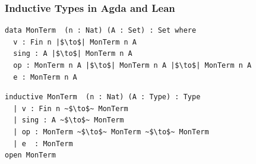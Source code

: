 \documentclass[t,10pt,numbers,fleqn,usenames,xcolor=dvipsnames]{beamer}
\begin{document}
\begin{frame}[fragile] 
\frametitle{Inductive Types in Agda and Lean} 
\begin{verbatim} 
data MonTerm  (n : Nat) (A : Set) : Set where 
  v : Fin n |$\to$| MonTerm n A 
  sing : A |$\to$| MonTerm n A 
  op : MonTerm n A |$\to$| MonTerm n A |$\to$| MonTerm n A 
  e : MonTerm n A 
\end{verbatim}
\begin{verbatim} 
inductive MonTerm  (n : Nat) (A : Type) : Type 
  | v : Fin n ~$\to$~ MonTerm
  | sing : A ~$\to$~ MonTerm
  | op : MonTerm ~$\to$~ MonTerm ~$\to$~ MonTerm 
  | e  : MonTerm
open MonTerm   
\end{verbatim}
\end{frame}
\end{document}

